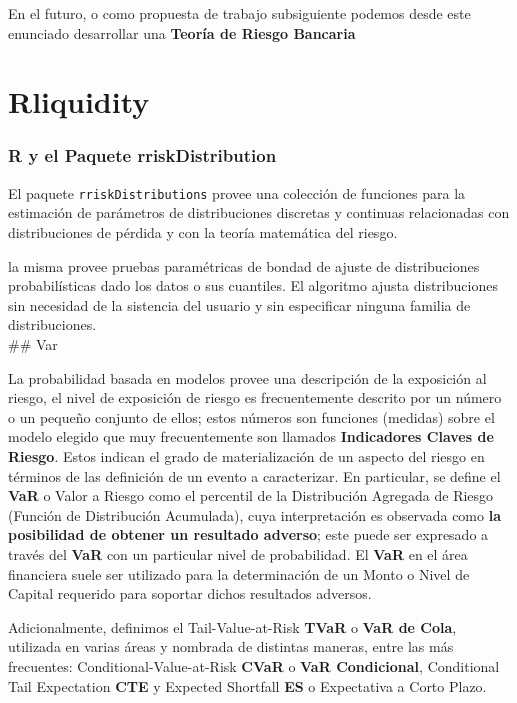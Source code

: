 \documentclass[]{article}
\begin{document}
En el futuro, o como propuesta de trabajo subsiguiente podemos desde
este enunciado desarrollar una \textbf{Teoría de Riesgo Bancaria}

\hypertarget{rliquidity}{%
\section{Rliquidity}\label{rliquidity}}

\hypertarget{r-y-el-paquete-rriskdistribution}{%
\subsubsection{\texorpdfstring{R y el Paquete
\textbf{rriskDistribution}}{R y el Paquete rriskDistribution}}\label{r-y-el-paquete-rriskdistribution}}

El paquete \texttt{rriskDistributions} provee una colección de funciones
para la estimación de parámetros de distribuciones discretas y continuas
relacionadas con distribuciones de pérdida y con la teoría matemática
del riesgo.

la misma provee pruebas paramétricas de bondad de ajuste de
distribuciones probabilísticas dado los datos o sus cuantiles. El
algoritmo ajusta distribuciones sin necesidad de la sistencia del
usuario y sin especificar ninguna familia de distribuciones.\\
\#\# Var

La probabilidad basada en modelos provee una descripción de la
exposición al riesgo, el nivel de exposición de riesgo es frecuentemente
descrito por un número o un pequeño conjunto de ellos; estos números son
funciones (medidas) sobre el modelo elegido que muy frecuentemente son
llamados \textbf{Indicadores Claves de Riesgo}. Estos indican el grado
de materialización de un aspecto del riesgo en términos de las
definición de un evento a caracterizar. En particular, se define el
\textbf{VaR} o Valor a Riesgo como el percentil de la Distribución
Agregada de Riesgo (Función de Distribución Acumulada), cuya
interpretación es observada como \textbf{la posibilidad de obtener un
resultado adverso}; este puede ser expresado a través del \textbf{VaR}
con un particular nivel de probabilidad. El \textbf{VaR} en el área
financiera suele ser utilizado para la determinación de un Monto o Nivel
de Capital requerido para soportar dichos resultados adversos.

Adicionalmente, definimos el Tail-Value-at-Risk \textbf{TVaR} o
\textbf{VaR de Cola}, utilizada en varias áreas y nombrada de distintas
maneras, entre las más frecuentes: Conditional-Value-at-Risk
\textbf{CVaR} o \textbf{VaR Condicional}, Conditional Tail Expectation
\textbf{CTE} y Expected Shortfall \textbf{ES} o Expectativa a Corto
Plazo.
\end{document}
